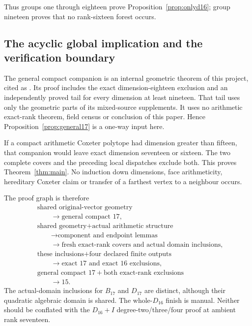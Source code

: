 \documentclass[11pt]{article}
\begin{document}
Thus groups one through eighteen
prove Proposition~\ref{prop:onlyd16};
group nineteen proves that no
rank-sixteen forest occurs.

\subsection{The acyclic global implication and the verification boundary}
\label{app:arithfinalimplication}

The general compact companion is
an internal geometric theorem of
this project, cited as
\cite{ProjectGeneral}.
Its proof includes the exact
dimension-eighteen exclusion and
an independently proved tail for
every dimension at least nineteen.
That tail uses only the geometric
parts of its mixed-source supplements.
It uses no arithmetic exact-rank
theorem, field census or conclusion
of this paper.
Hence Proposition~\ref{prop:general17}
is a one-way input here.

If a compact arithmetic Coxeter
polytope had dimension greater
than fifteen, that companion
would leave exact dimension
seventeen or sixteen.
The two complete covers and
the preceding local dispatches
exclude both.
This proves
Theorem~\ref{thm:main}.
No induction down dimensions,
face arithmeticity, hereditary
Coxeter claim or transfer of a
farthest vertex to a neighbour
occurs.

The proof graph is therefore
\[
 \begin{aligned}
 &\text{shared original-vector geometry}\\
 &\qquad\longrightarrow\text{general compact }17,\\[2pt]
 &\text{shared geometry}+\text{actual arithmetic structure}\\
 &\qquad\longrightarrow\text{component and endpoint lemmas}\\
 &\qquad\longrightarrow
       \text{fresh exact-rank covers and actual domain inclusions},\\[2pt]
 &\text{these inclusions}+\text{four declared finite outputs}\\
 &\qquad\longrightarrow\text{exact }17\text{ and exact }16\text{ exclusions},\\[2pt]
 &\text{general compact }17+\text{both exact-rank exclusions}\\
 &\qquad\longrightarrow15 .
 \end{aligned}
\]
The actual-domain inclusions for
\(B_{17}\) and \(D_{17}\) are
distinct, although their quadratic
algebraic domain is shared.
The whole-\(D_{16}\) finish is manual.
Neither should be conflated with
the \(D_{16}+I\) degree-two/three/four
proof at ambient rank seventeen.
\end{document}
